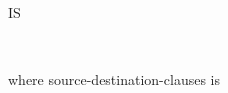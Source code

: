 \begin{0-1}
  \begin{1=}
     \\
  \end{1=}
  IS
  \begin{1=}
    \identifier \\
    \integer
  \end{1=}
\end{0-1}

where source-destination-clauses is

\begin{0-1}
  \begin{1=}
    \identifier \\
    \literal
  \end{1=} \\
\end{0-1}

\begin{0-1}
   \identifier
\end{0-1}

\begin{0-1}
   \identifier
\end{0-1}


